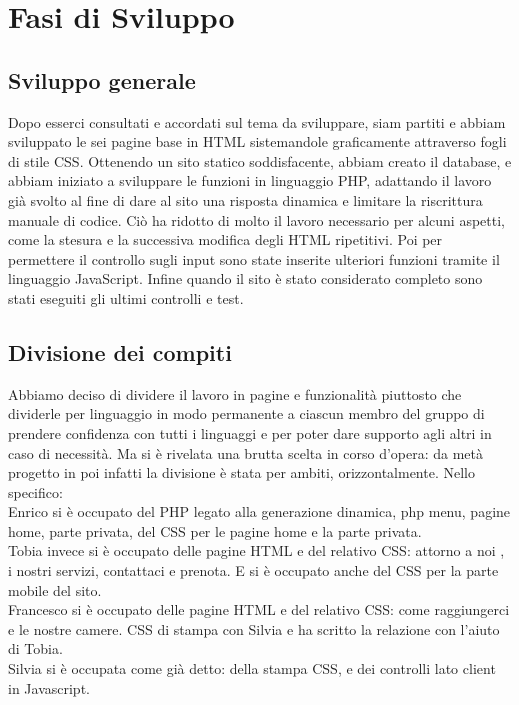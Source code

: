 \section{Fasi di Sviluppo}
\subsection{Sviluppo generale}
Dopo esserci consultati e accordati sul tema da sviluppare, siam partiti e abbiam sviluppato le sei pagine base in HTML sistemandole graficamente attraverso fogli di stile CSS. Ottenendo un sito statico soddisfacente, abbiam creato il database, e abbiam iniziato a sviluppare le funzioni in linguaggio PHP, adattando il lavoro già svolto al fine di dare al sito una risposta dinamica e limitare la riscrittura manuale di codice. Ciò ha ridotto di molto il lavoro necessario per alcuni aspetti, come la stesura e la successiva modifica degli HTML ripetitivi. Poi per permettere il controllo sugli input sono state inserite ulteriori funzioni tramite il linguaggio JavaScript. Infine quando il sito è stato considerato completo sono stati eseguiti gli ultimi controlli e test.
\subsection{Divisione dei compiti}
Abbiamo deciso di dividere il lavoro in pagine e funzionalità piuttosto che dividerle per linguaggio in modo permanente a ciascun membro del gruppo di prendere confidenza con tutti i linguaggi e per poter dare supporto agli altri in caso di necessità. Ma si è rivelata una brutta scelta in corso d’opera: da metà progetto in poi infatti la divisione è stata per ambiti, orizzontalmente. 
Nello specifico:\\

Enrico si è occupato del PHP legato alla generazione dinamica, php menu, pagine home, parte privata, del CSS per le pagine home e la parte privata.\\

Tobia invece si è occupato delle pagine HTML e del relativo CSS: attorno a noi , i nostri servizi, contattaci e prenota. E si è occupato anche del CSS per la parte mobile del sito.\\

Francesco si è occupato delle pagine HTML e del relativo CSS: come raggiungerci e le nostre camere. CSS di stampa con Silvia e ha scritto la relazione con l'aiuto di Tobia.\\

Silvia si è occupata come già detto: della stampa CSS, e dei controlli lato client in Javascript. 
